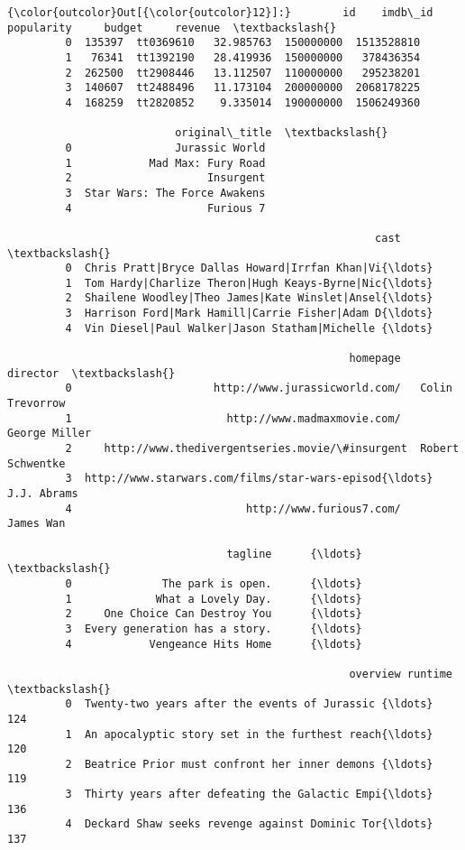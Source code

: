 \documentclass[11pt]{article}
\begin{document}
\begin{Verbatim}[commandchars=\\\{\}]
{\color{outcolor}Out[{\color{outcolor}12}]:}        id    imdb\_id  popularity     budget     revenue  \textbackslash{}
         0  135397  tt0369610   32.985763  150000000  1513528810   
         1   76341  tt1392190   28.419936  150000000   378436354   
         2  262500  tt2908446   13.112507  110000000   295238201   
         3  140607  tt2488496   11.173104  200000000  2068178225   
         4  168259  tt2820852    9.335014  190000000  1506249360   
         
                          original\_title  \textbackslash{}
         0                Jurassic World   
         1            Mad Max: Fury Road   
         2                     Insurgent   
         3  Star Wars: The Force Awakens   
         4                     Furious 7   
         
                                                         cast  \textbackslash{}
         0  Chris Pratt|Bryce Dallas Howard|Irrfan Khan|Vi{\ldots}   
         1  Tom Hardy|Charlize Theron|Hugh Keays-Byrne|Nic{\ldots}   
         2  Shailene Woodley|Theo James|Kate Winslet|Ansel{\ldots}   
         3  Harrison Ford|Mark Hamill|Carrie Fisher|Adam D{\ldots}   
         4  Vin Diesel|Paul Walker|Jason Statham|Michelle {\ldots}   
         
                                                     homepage          director  \textbackslash{}
         0                      http://www.jurassicworld.com/   Colin Trevorrow   
         1                        http://www.madmaxmovie.com/     George Miller   
         2     http://www.thedivergentseries.movie/\#insurgent  Robert Schwentke   
         3  http://www.starwars.com/films/star-wars-episod{\ldots}       J.J. Abrams   
         4                           http://www.furious7.com/         James Wan   
         
                                  tagline      {\ldots}       \textbackslash{}
         0              The park is open.      {\ldots}        
         1             What a Lovely Day.      {\ldots}        
         2     One Choice Can Destroy You      {\ldots}        
         3  Every generation has a story.      {\ldots}        
         4            Vengeance Hits Home      {\ldots}        
         
                                                     overview runtime  \textbackslash{}
         0  Twenty-two years after the events of Jurassic {\ldots}     124   
         1  An apocalyptic story set in the furthest reach{\ldots}     120   
         2  Beatrice Prior must confront her inner demons {\ldots}     119   
         3  Thirty years after defeating the Galactic Empi{\ldots}     136   
         4  Deckard Shaw seeks revenge against Dominic Tor{\ldots}     137   
         

\end{Verbatim}
\end{document}
